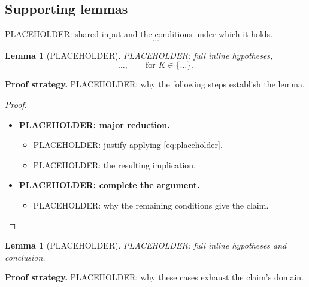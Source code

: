 \documentclass[12pt]{article}
\newtheorem{lemma}[theorem]{Lemma}
\theoremstyle{remark}
\begin{document}
\subsection*{Supporting lemmas}

PLACEHOLDER: shared input and the conditions under which it holds.
\begin{equation}\label{eq:placeholder}
\dots
\end{equation}

\begin{lemma}[PLACEHOLDER]\label{lem:a}
PLACEHOLDER: full inline hypotheses,
\[
\dots, \qquad \text{for } K \in \{\dots\}.
\]
\end{lemma}

\textbf{Proof strategy.} PLACEHOLDER: why the following steps establish the lemma.

\begin{proof}
\leavevmode\par
\begin{itemize}
  \item \textbf{PLACEHOLDER: major reduction.}
    \begin{itemize}
      \item PLACEHOLDER: justify applying \eqref{eq:placeholder}.
      \item PLACEHOLDER: the resulting implication.
    \end{itemize}
  \item \textbf{PLACEHOLDER: complete the argument.}
    \begin{itemize}
      \item PLACEHOLDER: why the remaining conditions give the claim. \qedhere
    \end{itemize}
\end{itemize}
\end{proof}

\begin{lemma}[PLACEHOLDER]\label{lem:b}
PLACEHOLDER: full inline hypotheses and conclusion.
\end{lemma}

\textbf{Proof strategy.} PLACEHOLDER: why these cases exhaust the claim's domain.
\end{document}
